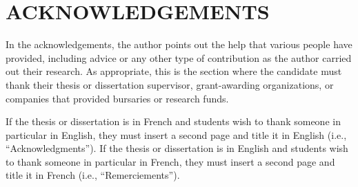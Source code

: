 %
\chapter*{ACKNOWLEDGEMENTS }\thispagestyle{headings}
%
In the acknowledgements, the author points out the help that various people have provided, including advice or any other type of contribution as the author carried out their research. As appropriate, this is the section where the candidate must thank their thesis or dissertation supervisor, grant-awarding organizations, or companies that provided bursaries or research funds. 

If the thesis or dissertation is in French and students wish to thank someone in particular in English, they must insert a second page and title it in English (i.e., “Acknowledgments”).  If the thesis or dissertation is in English and students wish to thank someone in particular in French, they must insert a second page and title it in French (i.e., “Remerciements”).

